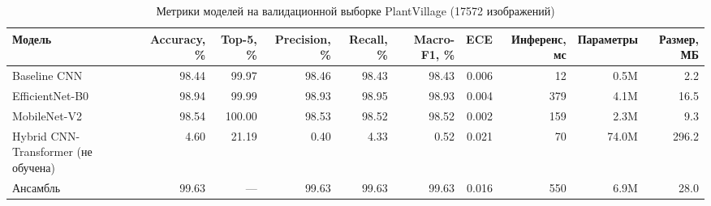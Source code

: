 \begin{table}[htbp]
\centering
\caption{Метрики моделей на валидационной выборке PlantVillage (17572 изображений)}
\label{tab:models}
\begin{tabular}{lrrrrrrrrr}
\toprule
Модель & Accuracy, \% & Top-5, \% & Precision, \% & Recall, \% & Macro-F1, \% & ECE & Инференс, мс & Параметры & Размер, МБ \\
\midrule
Baseline CNN & 98.44 & 99.97 & 98.46 & 98.43 & 98.43 & 0.006 & 12 & 0.5M & 2.2 \\
EfficientNet-B0 & 98.94 & 99.99 & 98.93 & 98.95 & 98.93 & 0.004 & 379 & 4.1M & 16.5 \\
MobileNet-V2 & 98.54 & 100.00 & 98.53 & 98.52 & 98.52 & 0.002 & 159 & 2.3M & 9.3 \\
Hybrid CNN-Transformer (не обучена) & 4.60 & 21.19 & 0.40 & 4.33 & 0.52 & 0.021 & 70 & 74.0M & 296.2 \\
Ансамбль & 99.63 & — & 99.63 & 99.63 & 99.63 & 0.016 & 550 & 6.9M & 28.0 \\
\bottomrule
\end{tabular}
\end{table}

